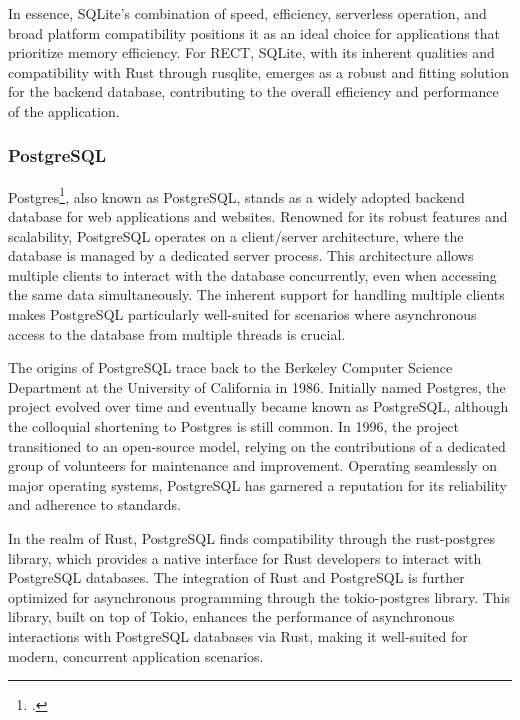 In essence, SQLite's combination of speed, efficiency, serverless operation, and broad platform compatibility positions it as an ideal choice for applications 
that prioritize memory efficiency. For RECT, SQLite, with its inherent qualities and compatibility with Rust through rusqlite, emerges as a robust and fitting 
solution for the backend database, contributing to the overall efficiency and performance of the application.

\subsubsection{PostgreSQL}
Postgres\footcite{postgres}, also known as PostgreSQL, stands as a widely adopted backend database for web applications and websites. Renowned for its robust 
features and scalability, PostgreSQL operates on a client/server architecture, where the database is managed by a dedicated server process. This architecture 
allows multiple clients to interact with the database concurrently, even when accessing the same data simultaneously. The inherent support for handling multiple 
clients makes PostgreSQL particularly well-suited for scenarios where asynchronous access to the database from multiple threads is crucial.\newline

The origins of PostgreSQL trace back to the Berkeley Computer Science Department at the University of California in 1986. Initially named Postgres, the project 
evolved over time and eventually became known as PostgreSQL, although the colloquial shortening to Postgres is still common. In 1996, the project transitioned 
to an open-source model, relying on the contributions of a dedicated group of volunteers for maintenance and improvement. Operating seamlessly on major 
operating systems, PostgreSQL has garnered a reputation for its reliability and adherence to standards.\newline

In the realm of Rust, PostgreSQL finds compatibility through the rust-postgres library, which provides a native interface for Rust developers to interact with 
PostgreSQL databases. The integration of Rust and PostgreSQL is further optimized for asynchronous programming through the tokio-postgres library. This library, 
built on top of Tokio, enhances the performance of asynchronous interactions with PostgreSQL databases via Rust, making it well-suited for modern, concurrent 
application scenarios.\newline

